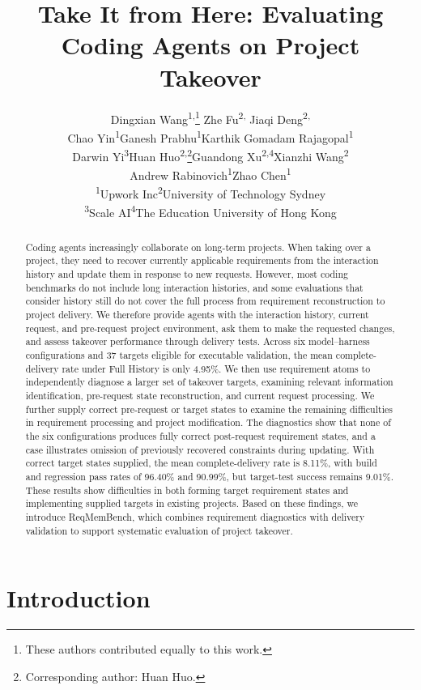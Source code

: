 \documentclass{article} %
\title{Take It from Here: Evaluating\\Coding Agents on Project Takeover}
\author{%
\normalfont
Dingxian Wang\textsuperscript{1,}\thanks{These authors contributed equally to this work.}\quad
Zhe Fu\textsuperscript{2,}\footnotemark[1]\quad
Jiaqi Deng\textsuperscript{2,}\footnotemark[1]\\
Chao Yin\textsuperscript{1}\quad Ganesh Prabhu\textsuperscript{1}\quad Karthik Gomadam Rajagopal\textsuperscript{1}\\
Darwin Yi\textsuperscript{3}\quad Huan Huo\textsuperscript{2,}\thanks{Corresponding author: Huan Huo.}\quad Guandong Xu\textsuperscript{2,4}\quad Xianzhi Wang\textsuperscript{2}\\
Andrew Rabinovich\textsuperscript{1}\quad Zhao Chen\textsuperscript{1}\\[0.5em]
{\small \textsuperscript{1}Upwork Inc\quad \textsuperscript{2}University of Technology Sydney}\\
{\small \textsuperscript{3}Scale AI\quad \textsuperscript{4}The Education University of Hong Kong}
}
\begin{document}
\raggedbottom

\maketitle
{}

\begin{abstract}

Coding agents increasingly collaborate on long-term projects. When taking over a project, they need to recover currently applicable requirements from the interaction history and update them in response to new requests. However, most coding benchmarks do not include long interaction histories, and some evaluations that consider history still do not cover the full process from requirement reconstruction to project delivery. We therefore provide agents with the interaction history, current request, and pre-request project environment, ask them to make the requested changes, and assess takeover performance through delivery tests. Across six model--harness configurations and 37 targets eligible for executable validation, the mean complete-delivery rate under Full History is only 4.95\%. We then use requirement atoms to independently diagnose a larger set of takeover targets, examining relevant information identification, pre-request state reconstruction, and current request processing. We further supply correct pre-request or target states to examine the remaining difficulties in requirement processing and project modification. The diagnostics show that none of the six configurations produces fully correct post-request requirement states, and a case illustrates omission of previously recovered constraints during updating. With correct target states supplied, the mean complete-delivery rate is 8.11\%, with build and regression pass rates of 96.40\% and 90.99\%, but target-test success remains 9.01\%. These results show difficulties in both forming target requirement states and implementing supplied targets in existing projects. Based on these findings, we introduce ReqMemBench, which combines requirement diagnostics with delivery validation to support systematic evaluation of project takeover.
\end{abstract}

\section{Introduction}
\label{sec:introduction}
\end{document}
